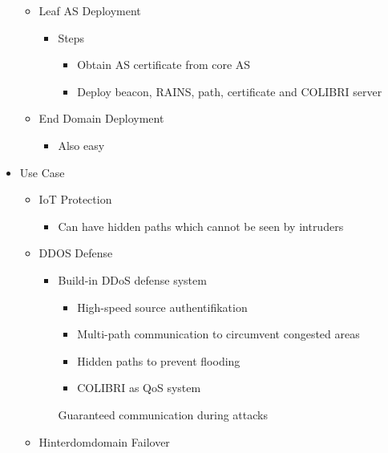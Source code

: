 \begin{itemize}
\begin{itemize}
\begin{itemize}
                \end{itemize}
            \item Leaf AS Deployment
                \begin{itemize}
                    \item Steps
                        \begin{itemize}
                            \item Obtain AS certificate from core AS
                            \item Deploy beacon, RAINS, path, certificate and COLIBRI server
                        \end{itemize}
                \end{itemize}
            \item End Domain Deployment
                \begin{itemize}
                    \item Also easy
                \end{itemize}
        \end{itemize}
    \item Use Case
        \begin{itemize}
            \item IoT Protection
                \begin{itemize}
                    \item Can have hidden paths which cannot be seen by intruders
                \end{itemize}
            \item DDOS Defense
                \begin{itemize}
                    \item Build-in DDoS defense system
                        \begin{itemize}
                            \item High-speed source authentifikation
                            \item Multi-path communication to circumvent congested areas
                            \item Hidden paths to prevent flooding 
                            \item COLIBRI as QoS system
                        \end{itemize}
                    \ipro Guaranteed communication during attacks
                \end{itemize}
            \item Hinterdomdomain Failover

\end{itemize}
\end{itemize}
